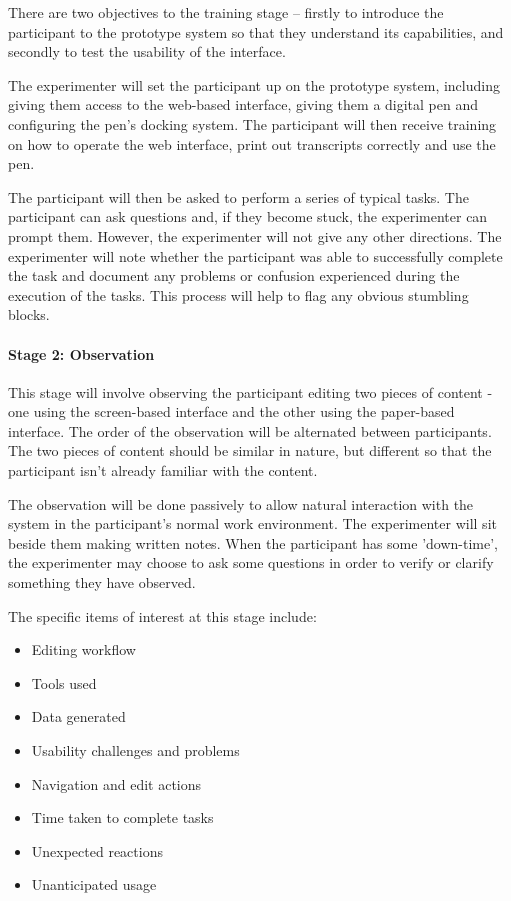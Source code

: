 There are two objectives to the training stage – firstly to introduce the participant to the prototype system so that
they understand its capabilities, and secondly to test the usability of the interface.

The experimenter will set the participant up on the prototype system, including giving them access to the web-based
interface, giving them a digital pen and configuring the pen’s docking system. The participant will then receive
training on how to operate the web interface, print out transcripts correctly and use the pen.

The participant will then be asked to perform a series of typical tasks. The participant can ask questions and, if they
become stuck, the experimenter can prompt them. However, the experimenter will not give any other directions. The
experimenter will note whether the participant was able to successfully complete the task and document any problems or
confusion experienced during the execution of the tasks. This process will help to flag any obvious stumbling blocks.

\paragraph{Stage 2: Observation}

This stage will involve observing the participant editing two pieces of content - one using the screen-based interface
and the other using the paper-based interface. The order of the observation will be alternated between participants.
The two pieces of content should be similar in nature, but different so that the participant isn't already familiar
with the content.

The observation will be done passively to allow natural interaction with the system in the participant's normal work
environment. The experimenter will sit beside them making written notes. When the participant has some 'down-time', the
experimenter may choose to ask some questions in order to verify or clarify something they have observed.

The specific items of interest at this stage include:
\begin{itemize}
\item Editing workflow
\item Tools used
\item Data generated
\item Usability challenges and problems
\item Navigation and edit actions
\item Time taken to complete tasks
\item Unexpected reactions
\item Unanticipated usage
\end{itemize}

